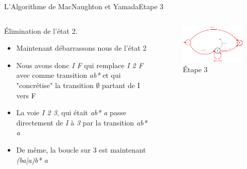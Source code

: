 \documentclass{beamer}
\begin{document}
\begin{frame}{L'Algorithme de MacNaughton et Yamada}{Etape 3}
     \begin{columns}[T]
     \begin{column}{.48\textwidth}
         {\fontsize{8}{9}\selectfont Élimination de l'état 2.}
         \begin{itemize}
         
             \item {\fontsize{7}{8}\selectfont Maintenant débarrassons nous de l'état 2}
             \item {\fontsize{7}{8}\selectfont Nous avons donc \textit{I F} qui remplace \textit{I 2 F} avec comme transition \textit{ab*} et qui "concrétise" la transition $\emptyset$ partant de I vers F}
             \item {\fontsize{7}{8}\selectfont La voie \textit{I 2 3}, qui était \textit{ab* a} passe directement de \textit{I} à \textit{3} par la transition \textit{ab* a}}
             \item {\fontsize{7}{8}\selectfont De même, la boucle sur 3 est maintenant \textit{(ba|a)b* a}}
             
         \end{itemize}
     \end{column}
     
     \begin{column}{.48\textwidth}
     \begin{figure}
     \includegraphics[scale=0.37]{Diagramme4_4.png}
     \centering
     \caption{Étape 3}     
     \end{figure}
     \end{column}
        
     \end{columns}
\end{frame}
\end{document}
